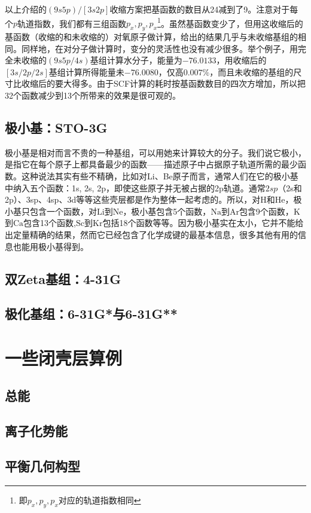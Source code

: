 {以上介绍的$(9s5p)/[3s2p]$收缩方案把基函数的数目从24减到了9。注意对于每个$p$轨道指数，我们都有三组函数$p_x,p_y,p_x$\footnote{即$p_x,p_y,p_x$对应的轨道指数相同}。虽然基函数变少了，但用这收缩后的基函数（收缩的和未收缩的）对氧原子做计算，给出的结果几乎与未收缩基组的相同。同样地，在对分子做计算时，变分的灵活性也没有减少很多。举个例子，用完全未收缩的$(9s5p/4s)$基组计算水分子，能量为$-76.0133$，用收缩后的$[3s/2p/2s]$基组计算所得能量未$-76.0080$，仅高$0.007\%$，而且未收缩的基组的尺寸比收缩后的要大得多。由于SCF计算的耗时按基函数数目的四次方增加，所以把32个函数减少到13个所带来的效果是很可观的。

\subsection{极小基：STO-3G}
极小基是相对而言不贵的一种基组，可以用她来计算较大的分子。我们说它极小，是指它在每个原子上都具备最少的函数——描述原子中占据原子轨道所需的最少函数。这种说法其实有些不精确，比如对Li、Be原子而言，通常人们在它的极小基中纳入五个函数：1s, 2s, 2p，即使这些原子并无被占据的2p轨道。通常$2sp$（2s和2p）、3sp、4sp、3d等等这些壳层都是作为整体一起考虑的。所以，对$\mathrm{H}$和$\mathrm{He}$，极小基只包含一个函数，对$\mathrm{Li}$到$\mathrm{Ne}$，极小基包含5个函数，$\mathrm{Na}$到$\mathrm{Ar}$包含9个函数，$\mathrm{K}$到$\mathrm{Ca}$包含13个函数,$\mathrm{Sc}$到$\mathrm{Kr}$包括18个函数等等。因为极小基实在太小，它并不能给出定量精确的结果，然而它已经包含了化学成键的最基本信息，很多其他有用的信息也能用极小基得到。



\subsection{双Zeta基组：4-31G}
\subsection{极化基组：6-31G*与6-31G**}
\section{一些闭壳层算例}
\subsection{总能}
\subsection{离子化势能}
\subsection{平衡几何构型}
}
